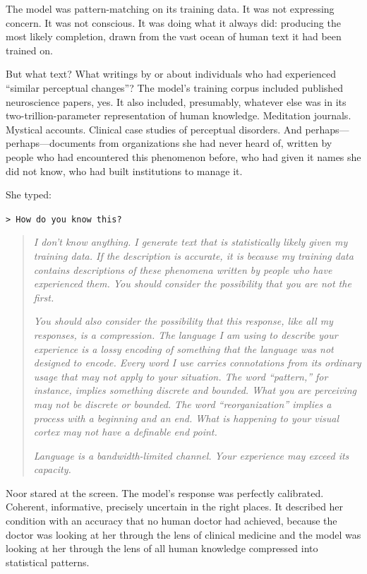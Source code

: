 The model was pattern-matching on its training data. It was not expressing concern. It was not conscious. It was doing what it always did: producing the most likely completion, drawn from the vast ocean of human text it had been trained on.

But what text? What writings by or about individuals who had experienced ``similar perceptual changes''? The model's training corpus included published neuroscience papers, yes. It also included, presumably, whatever else was in its two-trillion-parameter representation of human knowledge. Meditation journals. Mystical accounts. Clinical case studies of perceptual disorders. And perhaps---perhaps---documents from organizations she had never heard of, written by people who had encountered this phenomenon before, who had given it names she did not know, who had built institutions to manage it.

She typed:

\texttt{> How do you know this?}

\begin{quote}
\textit{I don't know anything. I generate text that is statistically likely given my training data. If the description is accurate, it is because my training data contains descriptions of these phenomena written by people who have experienced them. You should consider the possibility that you are not the first.}

\textit{You should also consider the possibility that this response, like all my responses, is a compression. The language I am using to describe your experience is a lossy encoding of something that the language was not designed to encode. Every word I use carries connotations from its ordinary usage that may not apply to your situation. The word ``pattern,'' for instance, implies something discrete and bounded. What you are perceiving may not be discrete or bounded. The word ``reorganization'' implies a process with a beginning and an end. What is happening to your visual cortex may not have a definable end point.}

\textit{Language is a bandwidth-limited channel. Your experience may exceed its capacity.}
\end{quote}

Noor stared at the screen. The model's response was perfectly calibrated. Coherent, informative, precisely uncertain in the right places. It described her condition with an accuracy that no human doctor had achieved, because the doctor was looking at her through the lens of clinical medicine and the model was looking at her through the lens of all human knowledge compressed into statistical patterns.


